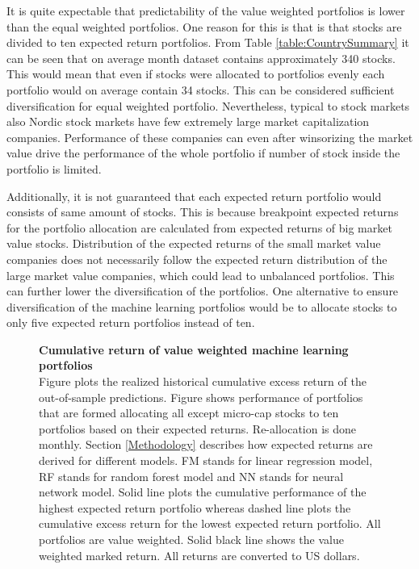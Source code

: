 \documentclass{article}
\begin{document}
It is quite expectable that predictability of the value weighted portfolios is lower than the equal weighted portfolios. One reason for this is that is that stocks are divided to ten expected return portfolios.  From Table \ref{table:CountrySummary} it can be seen that on average month dataset contains approximately 340 stocks. This would mean that even if stocks were allocated to portfolios evenly each portfolio would on average contain 34 stocks. This can be considered sufficient diversification for equal weighted portfolio. Nevertheless, typical to stock markets also Nordic stock markets have few extremely large market capitalization companies. Performance of these companies can even after winsorizing the market value drive the performance of the whole portfolio if number of stock inside the portfolio is limited. \par

Additionally, it is not guaranteed that each expected return portfolio would consists of same amount of stocks. This is because breakpoint expected returns for the portfolio allocation are calculated from expected returns of big market value stocks. Distribution of the expected returns of the small market value companies does not necessarily follow the expected return distribution of the large market value companies, which could lead to unbalanced portfolios. This can further  lower the diversification of the portfolios. One alternative to ensure diversification of the machine learning portfolios would be to allocate stocks to only five expected return portfolios instead of ten. \par

\begin{figure}[ht]
\centering
\caption[Cumulative return of value weighted machine learning portfolios]{\textbf{Cumulative return of value weighted machine learning portfolios}\\ Figure plots the realized historical cumulative excess return of the out-of-sample predictions. Figure shows performance of portfolios that are formed allocating all except micro-cap stocks to ten portfolios based on their expected returns. Re-allocation is done monthly. Section \ref{Methodology} describes how expected returns are derived for different models. FM stands for linear regression model, RF stands for random forest model and NN stands for neural network model. Solid line plots the cumulative performance of the highest expected return portfolio whereas dashed line plots the cumulative excess return for the lowest expected return portfolio. All portfolios are value weighted. Solid black line shows the value weighted marked return. All returns are converted to US dollars.}

\label{plot:cumul_vw_portf_return}
\end{figure}
\end{document}
